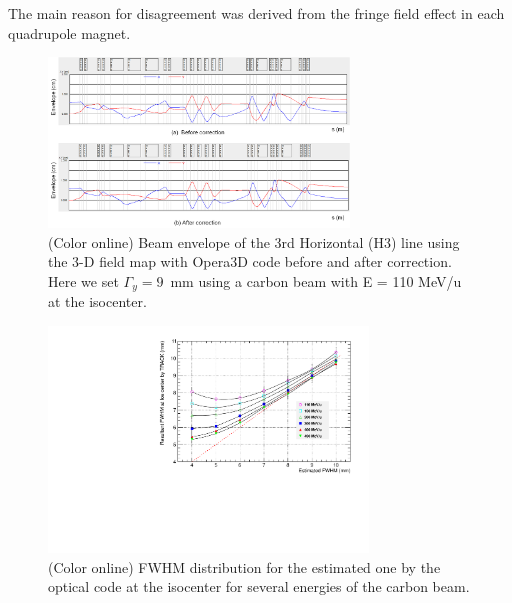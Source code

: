 \documentclass[jkps,preprint,fleqn,showpacs,showkeys,10pt,twocolumn]{revtex4}
\begin{document}
The main reason for disagreement was derived from the fringe field effect in each quadrupole magnet.
\begin{figure}[h]
  \begin{center}
    \includegraphics[width=8.0cm]{Fig06.png}    
    \caption{(Color online) Beam envelope of the 3rd Horizontal (H3) line using the 3-D field map with Opera3D code before and after correction.
      Here we set $\Gamma_{y} = 9$~mm using a carbon beam with E = 110 MeV/u at the isocenter.}
    \label{fig5}
  \end{center}
\end{figure}
\begin{figure}[h]
  \begin{center}
    \includegraphics[width=8.5cm]{Fig06-1.pdf}    
    \caption{(Color online) FWHM distribution for the estimated one by the optical code at the isocenter
      for several energies of the carbon beam.}
    \label{fig6}
  \end{center}
\end{figure}
\end{document}
